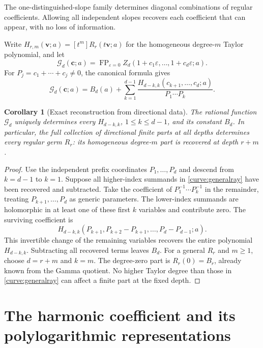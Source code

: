 \documentclass[11pt,letterpaper]{article}
\numberwithin{equation}{section}
\newtheorem{corollary}[theorem]{Corollary}
\theoremstyle{definition}
\theoremstyle{remark}
\DeclareMathOperator{\FP}{FP}
\newcommand{\eps}{\varepsilon}
\begin{document}
The one-distinguished-slope family determines diagonal combinations
of regular coefficients. Allowing all independent slopes recovers
each coefficient that can appear, with no loss of information.

Write $H_{r,m}(\boldsymbol v;a)=[t^m]R_r(t\boldsymbol v;a)$ for the
homogeneous degree-$m$ Taylor polynomial, and let
\[
 \mathcal G_d(\boldsymbol c;a)=\FP_{\eps=0}
 Z_d(1+c_1\eps,\ldots,1+c_d\eps;a).
\]
For $P_j=c_1+\cdots+c_j\ne0$, the canonical formula gives
\begin{equation}\label{curve:generalray}
 \mathcal G_d(\boldsymbol c;a)=B_d(a)+
 \sum_{k=1}^{d-1}
 \frac{H_{d-k,k}(c_{k+1},\ldots,c_d;a)}{P_1\cdots P_k}.
\end{equation}

\begin{corollary}[Exact reconstruction from directional data]
\label{curve:reconstruction}
The rational function $\mathcal G_d$ uniquely determines every
$H_{d-k,k}$, $1\le k\le d-1$, and its constant $B_d$. In particular,
the full collection of directional finite parts at all depths
determines every regular germ $R_r$: its homogeneous degree-$m$ part
is recovered at depth $r+m$.
\end{corollary}

\begin{proof}
Use the independent prefix coordinates $P_1,\ldots,P_d$ and descend
from $k=d-1$ to $k=1$. Suppose all higher-index summands in
\eqref{curve:generalray} have been recovered and subtracted. Take the
coefficient of $P_1^{-1}\cdots P_k^{-1}$ in the remainder, treating
$P_{k+1},\ldots,P_d$ as generic parameters. The lower-index summands
are holomorphic in at least one of these first $k$ variables and
contribute zero. The surviving coefficient is
\[
 H_{d-k,k}(P_{k+1},P_{k+2}-P_{k+1},\ldots,P_d-P_{d-1};a).
\]
This invertible change of the remaining variables recovers the
entire polynomial $H_{d-k,k}$. Subtracting all recovered terms leaves
$B_d$. For a general $R_r$ and $m\ge1$, choose $d=r+m$ and $k=m$.
The degree-zero part is $R_r(0)=B_r$, already known from the Gamma
quotient. No higher Taylor degree than those in
\eqref{curve:generalray} can affect a finite part at the fixed depth.
\end{proof}



\section{The harmonic coefficient and its polylogarithmic representations}
\label{sec:harmonic}
\end{document}

